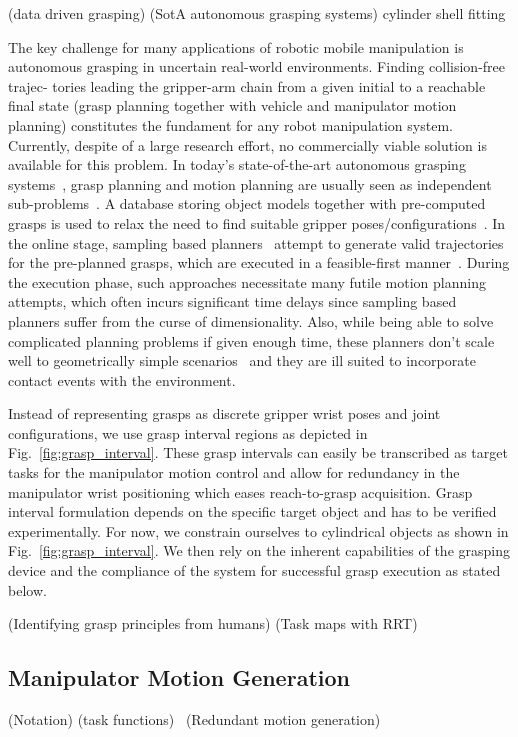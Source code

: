 \cite{Bohg14}(data driven grasping) (SotA autonomous grasping systems) \cite{Pas13} cylinder shell
fitting

The key challenge for many applications of robotic mobile manipulation is autonomous grasping in
uncertain real-world environments. Finding collision-free trajec- tories leading the gripper-arm
chain from a given initial to a reachable final state (grasp planning together with vehicle and
manipulator motion planning) constitutes the fundament for any robot manipulation system. Currently,
despite of a large research effort, no commercially viable solution is available for this
problem. In today’s state-of-the-art autonomous grasping systems~\cite{Bere07, Srin10, Krug14a},
grasp planning and motion planning are usually seen as independent sub-problems~\cite{Dian10}. A
database storing object models together with pre-computed grasps is used to relax the need to find
suitable gripper poses/configurations~\cite{Mill04, Gold11, Krug14a}. In the online stage, sampling
based planners~\cite{LaVa06} attempt to generate valid trajectories for the pre-planned grasps,
which are executed in a feasible-first manner~\cite{Bere07}. During the execution phase, such
approaches necessitate many futile motion planning attempts, which often incurs significant time
delays since sampling based planners suffer from the curse of dimensionality. Also, while being able
to solve complicated planning problems if given enough time, these planners don’t scale well to
geometrically simple scenarios~\cite{Ratl09} and they are ill suited to incorporate contact events
with the environment.

 Instead of representing grasps as discrete gripper wrist poses and joint
configurations, we use grasp interval regions as depicted in Fig.~\ref{fig:grasp_interval}. These
grasp intervals can easily be transcribed as target tasks for the manipulator motion control and
allow for redundancy in the manipulator wrist positioning which eases reach-to-grasp
acquisition. Grasp interval formulation depends on the specific target object and has to be verified
experimentally. For now, we constrain ourselves to cylindrical objects as shown in
Fig.~\ref{fig:grasp_interval}. We then rely on the inherent capabilities of the grasping device and
the compliance of the system for successful grasp execution as stated below.


\cite{Bala12}(Identifying grasp principles from humans) \cite{Gien08a, Gien08b, Vahr10}(Task maps with RRT)
%
\subsection{Manipulator Motion Generation}
\label{subsec:manip_motion}
%
\cite{Esca14}(Notation) \cite{Sams91}(task functions)
~\cite{Sici91, Sent10}(Redundant motion generation)

